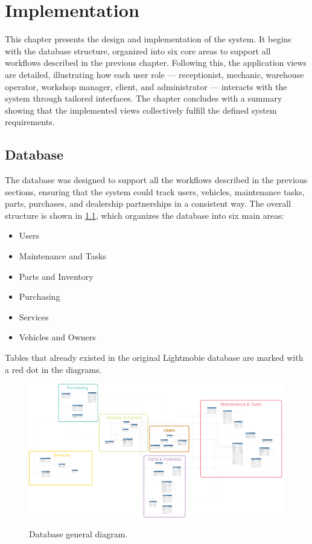 \chapter{Implementation}%
\label{chapter:methodology}

\begin{introduction}
This chapter presents the design and implementation of the system. It begins with the database structure, organized into six core areas to support all workflows described in the previous chapter. Following this, the application views are detailed, illustrating how each user role — receptionist, mechanic, warehouse operator, workshop manager, client, and administrator — interacts with the system through tailored interfaces. The chapter concludes with a summary showing that the implemented views collectively fulfill the defined system requirements.
\end{introduction} 


\section{Database} 


The database was designed to support all the workflows described in the previous sections, ensuring that the system could track users, vehicles, maintenance tasks, parts, purchases, and dealership partnerships in a consistent way. The overall structure is shown in \ref{fig:dbGeneral}, which organizes the database into six main areas:
 
\begin{itemize}
  \item Users
  \item Maintenance and Tasks
  \item Parts and Inventory 
  \item Purchasing
  \item Services
  \item Vehicles and Owners
\end{itemize}

Tables that already existed in the original Lightmobie database are marked with a red dot in the diagrams.

\begin{figure}[h]
  \caption{Database general diagram.}
  \centering
  \includegraphics[width=\textwidth]{figs/dbDiagrams/DbDiagramFull}
  \label{fig:dbGeneral} 
\end{figure}



